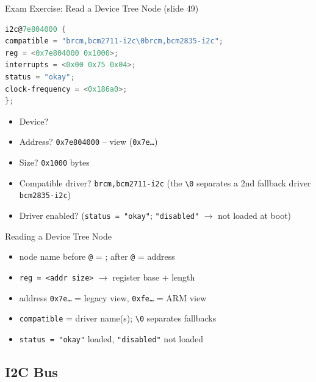 \begin{example2}{Exam Exercise: Read a Device Tree Node (slide 49)}
\begin{lstlisting}[language=C, style=basesmol, aboveskip=2pt, belowskip=2pt]
i2c@7e804000 {
compatible = "brcm,bcm2711-i2c\0brcm,bcm2835-i2c";
reg = <0x7e804000 0x1000>;
interrupts = <0x00 0x75 0x04>;
status = "okay";
clock-frequency = <0x186a0>;
};
\end{lstlisting}
    \tcblower
    \begin{itemize}
        \item Device? 
        \item Address? \texttt{0x7e804000} --  view (\texttt{0x7e\dots})
        \item Size? \texttt{0x1000} bytes
        \item Compatible driver? \texttt{brcm,bcm2711-i2c} (the \texttt{\textbackslash0}
              separates a 2nd fallback driver \texttt{bcm2835-i2c})
        \item Driver enabled?  (\texttt{status = "okay"}; \texttt{"disabled"}
              $\to$ not loaded at boot)
    \end{itemize}
\end{example2}

\begin{KR}{Reading a Device Tree Node}
    \begin{itemize}
        \item node name before \texttt{@} = ; after \texttt{@} = address
        \item \texttt{reg = <addr size>} $\to$ register base + length
        \item address \texttt{0x7e\dots} = legacy view, \texttt{0xfe\dots} = ARM view
        \item \texttt{compatible} = driver name(s); \texttt{\textbackslash0} separates fallbacks
        \item \texttt{status = "okay"} loaded, \texttt{"disabled"} not loaded
    \end{itemize}
\end{KR}

\subsection{I2C Bus}


